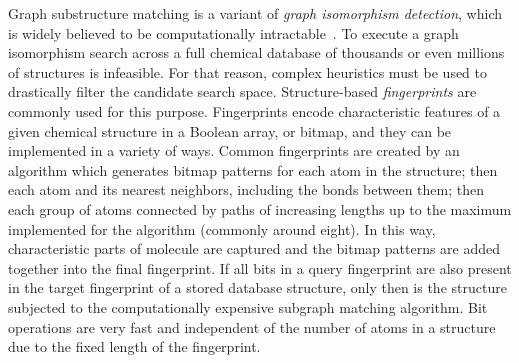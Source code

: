 \documentclass{sig-alternate}
\begin{document}
Graph substructure matching is a variant of \emph{graph isomorphism detection}, which is widely believed to be computationally
intractable~\cite{cordella2001}. To execute a graph isomorphism search
across a full chemical database of thousands or even millions of
structures is infeasible. For that reason, complex heuristics must be
used to drastically filter the candidate search space. Structure-based
\emph{fingerprints} are commonly used for this purpose. Fingerprints
encode characteristic features of a given chemical structure in a
Boolean array, or bitmap, and they can be implemented in a variety of
ways. Common fingerprints are created by an algorithm which generates
bitmap patterns for each atom in the structure; then each atom and its
nearest neighbors, including the bonds between them; then each group
of atoms connected by paths of increasing lengths up to the maximum
implemented for the algorithm (commonly around eight). In this way,
characteristic parts of molecule are captured and the bitmap patterns
are added together into the final fingerprint. If all bits in a query
fingerprint are also present in the target fingerprint of a stored
database structure, only then is the structure subjected to the
computationally expensive subgraph matching algorithm. Bit operations
are very fast and independent of the number of atoms in a structure
due to the fixed length of the fingerprint.
\end{document}
